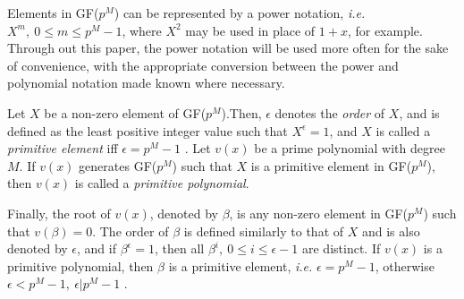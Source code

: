 Elements in GF($p^M$) can be represented by a power notation, \textit{i.e.} $X^m,~0 \leq m \leq p^M-1$, where $X^2$ may be used in place of $1+x$, for example. Through out this paper, the power notation will be used more often for the sake of convenience, with the appropriate conversion between the power and polynomial notation made known where necessary.  

Let $X$ be a non-zero element of GF($p^M$).Then, $\epsilon$ denotes the \textit{order} of $X$, and is defined as the least positive integer value such that $X^{\epsilon}=1$, and $X$ is called a \textit{primitive element} iff $\epsilon=p^M-1$ . Let $v(x)$ be a prime polynomial with degree $M$. If $v(x)$ generates GF($p^M$) such that $X$ is a primitive element in GF($p^M$), then  $v(x)$ is called a \textit{primitive polynomial}. 

Finally, the root of $v(x)$, denoted by $\beta$, is any non-zero element in GF($p^M$) such that $v(\beta)=0$. The order of $\beta$ is defined similarly to that of $X$ and is also denoted by $\epsilon$, and if $\beta^{\epsilon}=1$, then all $\beta^i,~0 \leq i \leq \epsilon -1$ are distinct.
 If $v(x)$ is a primitive polynomial, then $\beta$ is a primitive element, \textit{i.e.} $\epsilon=p^M-1$, otherwise $\epsilon < p^M-1,~ \epsilon | p^M-1$ . 

